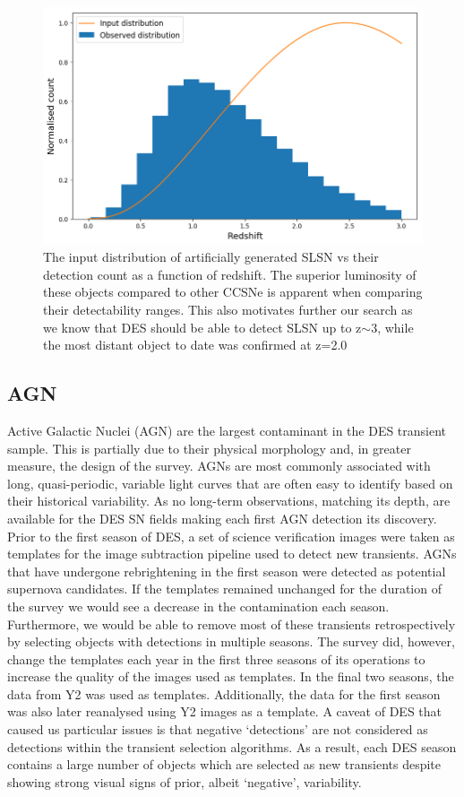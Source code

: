 \begin{figure}
  \includegraphics[width=\textwidth]{Figures/Chapter5/SLSN_z_dist.png}
  \caption{The input distribution of artificially generated SLSN vs their detection count as a function of redshift. The superior luminosity of these objects compared to other CCSNe is apparent when comparing their detectability ranges. This also motivates further our search as we know that DES should be able to detect SLSN up to z$\sim$3, while the most distant object to date was confirmed at z=2.0}
  \label{fig:SLSNDist}
\end{figure}

\subsection{AGN}
Active Galactic Nuclei (AGN) are the largest contaminant in the DES transient sample. This is partially due to their physical morphology and, in greater measure, the design of the survey. AGNs are most commonly associated with long, quasi-periodic, variable light curves that are often easy to identify based on their historical variability. As no long-term observations, matching its depth, are available for the DES SN fields making each first AGN detection its discovery. Prior to the first season of DES, a set of science verification images were taken as templates for the image subtraction pipeline used to detect new transients. AGNs that have undergone rebrightening in the first season were detected as potential supernova candidates. If the templates remained unchanged for the duration of the survey we would see a decrease in the contamination each season. Furthermore, we would be able to remove most of these transients retrospectively by selecting objects with detections in multiple seasons. The survey did, however, change the templates each year in the first three seasons of its operations to increase the quality of the images used as templates. In the final two seasons, the data from Y2 was used as templates. Additionally, the data for the first season was also later reanalysed using Y2 images as a template. A caveat of DES that caused us particular issues is that negative `detections' are not considered as detections within the transient selection algorithms. As a result, each DES season contains a large number of objects which are selected as new transients despite showing strong visual signs of prior, albeit `negative', variability.

